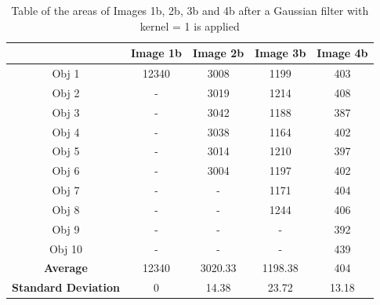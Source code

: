 \documentclass[runningheads]{llncs}
\begin{document}
\begin{table}[h!]
\centering
\begin{tabular}{|c|c|c|c|c|}
\hline
\textbf{} & \textbf{Image 1b} & \textbf{Image 2b} & \textbf{Image 3b} & \textbf{Image 4b} \\
\hline
Obj 1 & 12340      & 3008  & 1199 &  403 \\ \hline
Obj 2 &   -         & 3019  & 1214 &  408\\ \hline
Obj 3 &   -         & 3042  & 1188 &  387\\ \hline
Obj 4 &   -         & 3038  & 1164 &  402\\ \hline
Obj 5 &   -        & 3014  & 1210 &  397\\ \hline
Obj 6 &    -        & 3004  & 1197 &  402\\ \hline
Obj 7 &   -         &  -     & 1171 &  404\\ \hline
Obj 8 &    -        &  -     & 1244 &  406 \\ \hline
Obj 9 &   -         & -      &  -    &  392\\ \hline
Obj 10 &  -         &  -     &  -    &  439\\ \hline
\textbf{Average} &   12340    &  3020.33      &   1198.38    & 404  \\ \hline
\textbf{Standard Deviation} &  0      &  14.38      &    23.72   & 13.18  \\ \hline
\end{tabular}
\caption{Table of the areas of Images 1b, 2b, 3b and 4b after a Gaussian filter with kernel = 1 is applied }
\label{tab:Area-SeriesB-Gaussian1}
\end{table}
\end{document}
